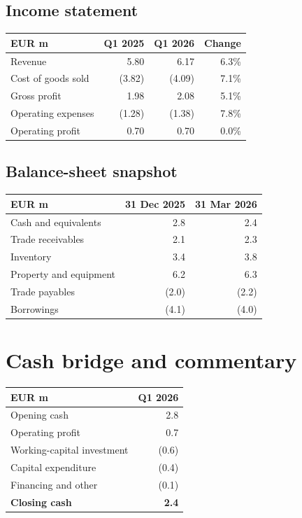 \documentclass[11pt,a4paper]{report}
\begin{document}
\section{Income statement}
\begin{center}
\begin{tabular}{lrrr}\toprule EUR m & Q1 2025 & Q1 2026 & Change\\\midrule Revenue & 5.80 & 6.17 & 6.3\%\\ Cost of goods sold & (3.82) & (4.09) & 7.1\%\\ Gross profit & 1.98 & 2.08 & 5.1\%\\ Operating expenses & (1.28) & (1.38) & 7.8\%\\ Operating profit & 0.70 & 0.70 & 0.0\%\\\bottomrule\end{tabular}\end{center}
\section{Balance-sheet snapshot}
\begin{center}\begin{tabular}{lrr}\toprule EUR m & 31 Dec 2025 & 31 Mar 2026\\\midrule Cash and equivalents & 2.8 & 2.4\\ Trade receivables & 2.1 & 2.3\\ Inventory & 3.4 & 3.8\\ Property and equipment & 6.2 & 6.3\\ Trade payables & (2.0) & (2.2)\\ Borrowings & (4.1) & (4.0)\\\bottomrule\end{tabular}\end{center}
\chapter{Cash bridge and commentary}
\begin{center}
\begin{tabular}{lr}\toprule EUR m & Q1 2026\\\midrule Opening cash & 2.8\\ Operating profit & 0.7\\ Working-capital investment & (0.6)\\ Capital expenditure & (0.4)\\ Financing and other & (0.1)\\ \textbf{Closing cash} & \textbf{2.4}\\\bottomrule\end{tabular}\end{center}
\end{document}
